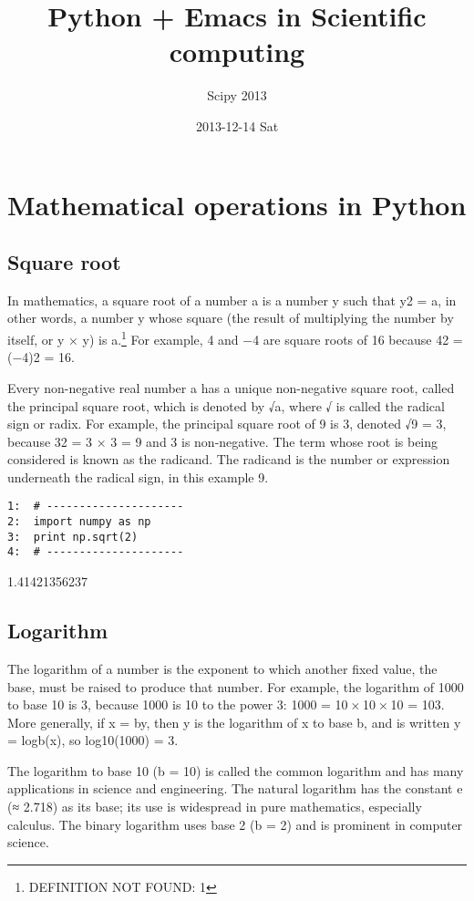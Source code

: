 \documentclass[11pt]{article}
\title{Python + Emacs in Scientific computing}
\author{Scipy 2013}
\date{2013-12-14 Sat}
\begin{document}
\maketitle



\section{Mathematical operations in Python}
\label{sec-1}
\subsection{Square root}
\label{sec-1-1}


    In mathematics, a square root of a number a is a number y such
    that y2 = a, in other words, a number y whose square (the result
    of multiplying the number by itself, or y × y) is a.\footnote{DEFINITION NOT FOUND: 1 } For
    example, 4 and −4 are square roots of 16 because 42 = (−4)2 = 16.

    Every non-negative real number a has a unique non-negative square
    root, called the principal square root, which is denoted by √a,
    where √ is called the radical sign or radix. For example, the
    principal square root of 9 is 3, denoted √9 = 3, because 32 = 3 ×
    3 = 9 and 3 is non-negative. The term whose root is being
    considered is known as the radicand. The radicand is the number or
    expression underneath the radical sign, in this example 9.


\begin{verbatim}
1:  # ---------------------
2:  import numpy as np
3:  print np.sqrt(2)
4:  # ---------------------
\end{verbatim}

    1.41421356237
\subsection{Logarithm}
\label{sec-1-2}


    The logarithm of a number is the exponent to which another fixed
    value, the base, must be raised to produce that number. For
    example, the logarithm of 1000 to base 10 is 3, because 1000 is 10
    to the power 3: 1000 = 10 × 10 × 10 = 103. More generally, if x =
    by, then y is the logarithm of x to base b, and is written y =
    logb(x), so log10(1000) = 3.

    The logarithm to base 10 (b = 10) is called the common logarithm
    and has many applications in science and engineering. The natural
    logarithm has the constant e (≈ 2.718) as its base; its use is
    widespread in pure mathematics, especially calculus. The binary
    logarithm uses base 2 (b = 2) and is prominent in computer
    science.
\end{document}
